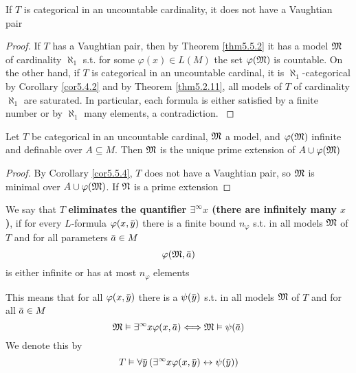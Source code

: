 \documentclass[11pt]{article}
\begin{document}
\begin{corollary}[]
\label{cor5.5.4}
If \(T\) is categorical in an uncountable cardinality, it does not have a Vaughtian pair
\end{corollary}

\begin{proof}
If \(T\) has a Vaughtian pair, then by Theorem \ref{thm5.5.2} it has a model \(\mathfrak{M}\) of
cardinality \(\aleph_1\) s.t. for some \(\varphi(x)\in L(M)\) the set \(\varphi(\mathfrak{M})\) is countable. On the other
hand, if \(T\) is categorical in an uncountable cardinal, it is \(\aleph_1\)-categorical by Corollary
\ref{cor5.4.2} and by Theorem \ref{thm5.2.11}, all models of \(T\) of cardinality \(\aleph_1\) are
saturated. In particular, each formula is either satisfied by a finite number or by \(\aleph_1\) many
elements, a contradiction. \label{Problem2}
\end{proof}

\begin{corollary}[]
\label{cor5.5.5}
Let \(T\) be categorical in an uncountable cardinal, \(\mathfrak{M}\) a model, and \(\varphi(\mathfrak{M})\) infinite and
definable over \(A\subseteq M\). Then \(\mathfrak{M}\) is the unique prime extension of \(A\cup\varphi(\mathfrak{M})\)
\end{corollary}

\begin{proof}
By Corollary \ref{cor5.5.4}, \(T\) does not have a Vaughtian pair, so \(\mathfrak{M}\) is minimal
over \(A\cup\varphi(\mathfrak{M})\). If \(\mathfrak{N}\) is a prime extension
\end{proof}

\begin{definition}[]
We say that \(T\) \textbf{eliminates the quantifier \(\exists^\infty x\) (there are infinitely many \(x\))}, if for
every \(L\)-formula \(\varphi(x,\bary)\) there is a finite bound \(n_\varphi\) s.t. in all models \(\mathfrak{M}\)
of \(T\) and for all parameters \(\bara\in M\)
\begin{equation*}
\varphi(\fM,\bara)
\end{equation*}
is either infinite or has at most \(n_\varphi\) elements
\end{definition}

\begin{remark}
This means that for all \(\varphi(x,\bary)\) there is a \(\psi(\bary)\) s.t. in all models \(\mathfrak{M}\) of \(T\)
and for all \(\bara\in M\)
\begin{equation*}
\fM\vDash\exists^\infty x\varphi(x,\bara)\Longleftrightarrow\fM\vDash\psi(\bara)
\end{equation*}
We denote this by
\begin{equation*}
T\vDash\forall\bary\left( \exists^\infty x\varphi(x,\bary)\leftrightarrow\psi(\bary) \right)
\end{equation*}
\end{remark}
\end{document}
